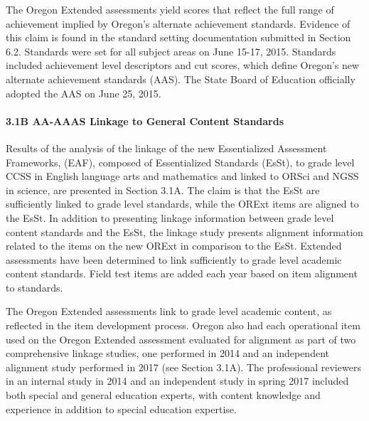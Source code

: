 \documentclass[]{article}
\let\oldparagraph\paragraph
\renewcommand{\paragraph}[1]{\oldparagraph{#1}\mbox{}}
\begin{document}
The Oregon Extended assessments yield scores that reflect the full range
of achievement implied by Oregon's alternate achievement standards.
Evidence of this claim is found in the standard setting documentation
submitted in Section 6.2. Standards were set for all subject areas on
June 15-17, 2015. Standards included achievement level descriptors and
cut scores, which define Oregon's new alternate achievement standards
(AAS). The State Board of Education officially adopted the AAS on June
25, 2015.

\paragraph{3.1B AA-AAAS Linkage to General Content
Standards}\label{b-aa-aaas-linkage-to-general-content-standards}

Results of the analysis of the linkage of the new Essentialized
Assessment Frameworks, (EAF), composed of Essentialized Standards
(EsSt), to grade level CCSS in English language arts and mathematics and
linked to ORSci and NGSS in science, are presented in Section 3.1A. The
claim is that the EsSt are sufficiently linked to grade level standards,
while the ORExt items are aligned to the EsSt. In addition to presenting
linkage information between grade level content standards and the EsSt,
the linkage study presents alignment information related to the items on
the new ORExt in comparison to the EsSt. Extended assessments have been
determined to link sufficiently to grade level academic content
standards. Field test items are added each year based on item alignment
to standards.

The Oregon Extended assessments link to grade level academic content, as
reflected in the item development process. Oregon also had each
operational item used on the Oregon Extended assessment evaluated for
alignment as part of two comprehensive linkage studies, one performed in
2014 and an independent alignment study performed in 2017 (see Section
3.1A). The professional reviewers in an internal study in 2014 and an
independent study in spring 2017 included both special and general
education experts, with content knowledge and experience in addition to
special education expertise.
\end{document}
